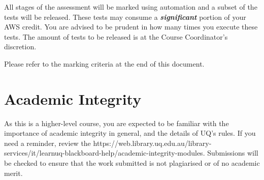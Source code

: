 \documentclass{csse4400}
\begin{document}
All stages of the assessment will be marked using automation and a subset of the tests will be released.
These tests may consume a \textbf{\emph{significant}} portion of your AWS credit.
You are advised to be prudent in how many times you execute these tests.
The amount of tests to be released is at the Course Coordinator's discretion.

Please refer to the marking criteria at the end of this document.

%
%
%


\section{Academic Integrity}
As this is a higher-level course, you are expected to be familiar with the importance of academic integrity in general,
and the details of UQ's rules.
If you need a reminder, review the 
{https://web.library.uq.edu.au/library-services/it/learnuq-blackboard-help/academic-integrity-modules}.
Submissions will be checked to ensure that the work submitted is not plagiarised or of no academic merit.
\end{document}
